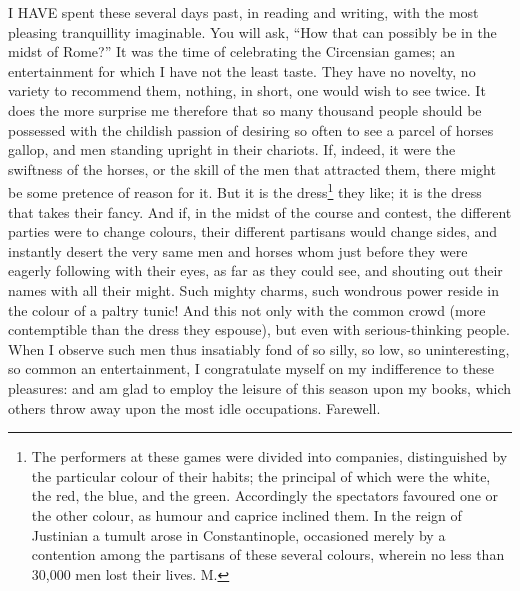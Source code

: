 
I HAVE spent these several days past, in reading and writing, with the
most pleasing tranquillity imaginable. You will ask, ``How that can
possibly be in the midst of Rome?'' It was the time of celebrating the
Circensian games; an entertainment for which I have not the least taste.
They have no novelty, no variety to recommend them, nothing, in short, one
would wish to see twice. It does the more surprise me therefore that so
many thousand people should be possessed with the childish passion of
desiring so often to see a parcel of horses gallop, and men standing
upright in their chariots. If, indeed, it were the swiftness of the
horses, or the skill of the men that attracted them, there might be some
pretence of reason for it. But it is the dress\footnote{The performers at these
games were divided into companies, distinguished by the particular colour
of their habits; the principal of which were the white, the red, the blue,
and the green. Accordingly the spectators favoured one or the other
colour, as humour and caprice inclined them. In the reign of Justinian a
tumult arose in Constantinople, occasioned merely by a contention among
the partisans of these several colours, wherein no less than 30,000 men
lost their lives. M.} they like; it is the
dress that takes their fancy. And if, in the midst of the course and
contest, the different parties were to change colours, their different
partisans would change sides, and instantly desert the very same men and
horses whom just before they were eagerly following with their eyes, as
far as they could see, and shouting out their names with all their might.
Such mighty charms, such wondrous power reside in the colour of a paltry
tunic! And this not only with the common crowd (more contemptible than the
dress they espouse), but even with serious-thinking people. When I observe
such men thus insatiably fond of so silly, so low, so uninteresting, so
common an entertainment, I congratulate myself on my indifference to these
pleasures: and am glad to employ the leisure of this season upon my books,
which others throw away upon the most idle occupations. Farewell.


